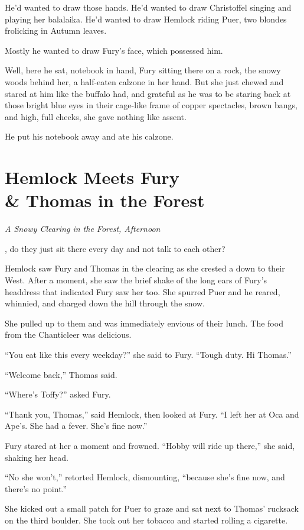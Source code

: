 \documentclass[11pt,a5paper]{article}
\newcommand{\alet}[1]{\textit{#1}\vspace{1em}}
\begin{document}
He'd wanted to draw those hands. He'd wanted to draw Christoffel singing and playing her balalaika. He'd wanted to draw Hemlock riding Puer, two blondes frolicking in Autumn leaves.

Mostly he wanted to draw Fury's face, which possessed him.

Well, here he sat, notebook in hand, Fury sitting there on a rock, the snowy woods behind her, a half-eaten calzone in her hand. But she just chewed and stared at him like the buffalo had, and grateful as he was to be staring back at those bright blue eyes in their cage-like frame of copper spectacles, brown bangs, and high, full cheeks, she gave nothing like assent.

He put his notebook away and ate his calzone.

\newpage

\section{Hemlock Meets Fury\\ \& Thomas in the Forest}

\alet{A Snowy Clearing in the Forest, Afternoon}

, do they just sit there every day and not talk to each other?

Hemlock saw Fury and Thomas in the clearing as she crested a down to their West. After a moment, she saw the brief shake of the long ears of Fury's headdress that indicated Fury saw her too. She spurred Puer and he reared, whinnied, and charged down the hill through the snow.

She pulled up to them and was immediately envious of their lunch. The food from the Chanticleer was delicious.

``You eat like this every weekday?'' she said to Fury. ``Tough duty. Hi Thomas.''

``Welcome back,'' Thomas said.

``Where's Toffy?'' asked Fury.

``Thank you, Thomas,'' said Hemlock, then looked at Fury. ``I left her at Oca and Ape's. She had a fever. She's fine now.''

Fury stared at her a moment and frowned. ``Hobby will ride up there,'' she said, shaking her head.

``No she won't,'' retorted Hemlock, dismounting, ``because she's fine now, and there's no point.''

She kicked out a small patch for Puer to graze and sat next to Thomas' rucksack on the third boulder. She took out her tobacco and started rolling a cigarette.
\end{document}
